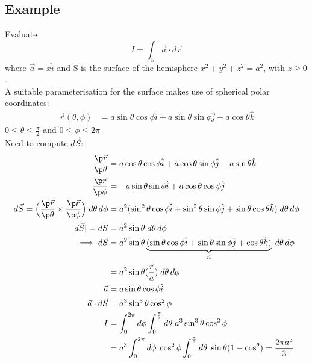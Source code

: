 \documentclass[a4paper, 11pt, normalem]{report}
\begin{document}
\subsection{Example}
Evaluate
\begin{equation*}
    I = \int_S \vec{a} \cdot d\vec{r}
\end{equation*}
where $\vec{a} = x\hat{i}$ and S is the surface of the hemisphere $x^2 + y^2 + z^2 = a^2$, with $z \geq 0$. \\
A suitable parameterisation for the surface makes use of spherical polar coordinates:
\begin{align*}
    \vec{r}(\theta, \phi) &= a\sin\theta\cos\phi \hat{i} + a\sin\theta\sin\phi \hat{j} + a\cos\theta\hat{k}
\end{align*}
$0 \leq \theta \leq \frac{\pi}{2}$ and $0 \leq \phi \leq 2\pi$ \\
Need to compute $d\vec{S}$:
\begin{align*}
    \frac{\p \vec{r}}{\p \theta} &= a\cos\theta\cos\phi \hat{i} + a\cos\theta\sin\phi \hat{j} - a\sin\theta \hat{k} \\
    \frac{\p \vec{r}}{\p \phi} &= -a\sin\theta\sin\phi \hat{i} + a\cos\theta\cos\phi \hat{j} \\
    d\vec{S} = \Big(\frac{\p \vec{r}}{\p \theta} \times \frac{\p \vec{r}}{\p \phi}\Big)\;d\theta\,d\phi &= a^2(\sin^2\theta\cos\phi \hat{i} + \sin^2\theta\sin\phi \hat{j} + \sin\theta\cos\theta \hat{k})\;d\theta\,d\phi \\
    |d\vec{S}| = dS &= a^2\sin\theta\;d\theta\,d\phi \\
    \implies d\vec{S} &= a^2\sin\theta \underbrace{(\sin\theta\cos\phi \hat{i} + \sin\theta\sin\phi \hat{j} + \cos\theta \hat{k})}_{\hat{n}}\;d\theta\,d\phi \\
    &= a^2\sin\theta (\frac{\vec{r}}{a})\;d\theta\,d\phi \\
    \vec{a} &= a\sin\theta\cos\phi \hat{i} \\
    \vec{a} \cdot d\vec{S} &= a^3 \sin^3\theta \cos^2\phi \\
    I &= \int_{0}^{2\pi}d\phi \int_{0}^{\frac{\pi}{2}} d\theta\; a^3 \sin^3\theta \cos^2\phi \\
    &= a^3 \int_{0}^{2\pi} d\phi\; \cos^2\phi \int_{0}^{\frac{\pi}{2}} d\theta\; \sin\theta(1 - \cos^\theta) = \frac{2\pi a^3}{3}
\end{align*}
\end{document}

